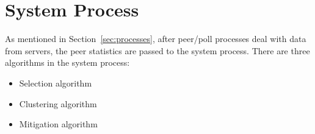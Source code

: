 

\chapter{System Process}
\label{cha:system_process}

As mentioned in Section~\ref{sec:processes}, after peer/poll processes deal
with data from servers, the peer statistics are passed to the system process.
There are three algorithms in the system process:
\begin{itemize}
    \item Selection algorithm
    \item Clustering algorithm
    \item Mitigation algorithm
\end{itemize}
